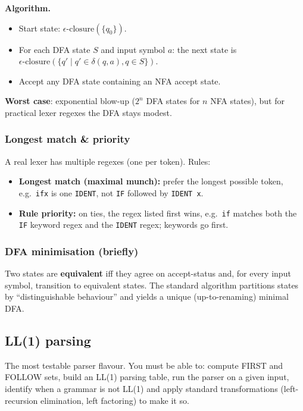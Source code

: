 \documentclass[11pt,a4paper]{article}
\begin{document}
\textbf{Algorithm.}
\begin{itemize}[leftmargin=*,itemsep=0pt]
  \item Start state: $\epsilon\text{-closure}(\{q_0\})$.
  \item For each DFA state $S$ and input symbol $a$: the next state is $\epsilon\text{-closure}(\{q' \mid q' \in \delta(q, a), q \in S\})$.
  \item Accept any DFA state containing an NFA accept state.
\end{itemize}

\textbf{Worst case}: exponential blow-up ($2^n$ DFA states for $n$ NFA states), but for practical lexer regexes the DFA stays modest.

\subsubsection*{Longest match \& priority}

A real lexer has multiple regexes (one per token). Rules:
\begin{itemize}[leftmargin=*,itemsep=0pt]
  \item \textbf{Longest match (maximal munch):} prefer the longest possible token, e.g.\ \texttt{ifx} is one \texttt{IDENT}, not \texttt{IF} followed by \texttt{IDENT x}.
  \item \textbf{Rule priority:} on ties, the regex listed first wins, e.g.\ \texttt{if} matches both the \texttt{IF} keyword regex and the \texttt{IDENT} regex; keywords go first.
\end{itemize}

\subsubsection*{DFA minimisation (briefly)}

Two states are \textbf{equivalent} iff they agree on accept-status and, for every input symbol, transition to equivalent states. The standard algorithm partitions states by ``distinguishable behaviour'' and yields a unique (up-to-renaming) minimal DFA.

\subsection{LL(1) parsing}

\begin{must}
The most testable parser flavour. You must be able to: compute FIRST and FOLLOW sets, build an LL(1) parsing table, run the parser on a given input, identify when a grammar is not LL(1) and apply standard transformations (left-recursion elimination, left factoring) to make it so.
\end{must}
\end{document}
